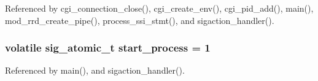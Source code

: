 Referenced by cgi\-\_\-connection\-\_\-close(), cgi\-\_\-create\-\_\-env(), cgi\-\_\-pid\-\_\-add(), main(), mod\-\_\-rrd\-\_\-create\-\_\-pipe(), process\-\_\-ssi\-\_\-stmt(), and sigaction\-\_\-handler().

\hypertarget{lighttpd-angel_8c_aec4d4b2dd9e166ad2c84b1f73d70aae2}{
\subsubsection[{start\-\_\-process}]{\setlength{\rightskip}{0pt plus 5cm}volatile sig\-\_\-atomic\-\_\-t start\-\_\-process = 1\hspace{0.3cm}{\ttfamily [static]}}}\label{lighttpd-angel_8c_aec4d4b2dd9e166ad2c84b1f73d70aae2}


Referenced by main(), and sigaction\-\_\-handler().

